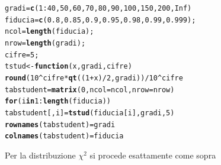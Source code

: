 \documentclass[onecolumn,12pt]{book}\usepackage[]{graphicx}\usepackage[]{color}
\makeatletter
\newcommand{\hlnum}[1]{\textcolor[rgb]{0.686,0.059,0.569}{#1}}%
\newcommand{\hlopt}[1]{\textcolor[rgb]{0,0,0}{#1}}%
\newcommand{\hlstd}[1]{\textcolor[rgb]{0.345,0.345,0.345}{#1}}%
\newcommand{\hlkwa}[1]{\textcolor[rgb]{0.161,0.373,0.58}{\textbf{#1}}}%
\newcommand{\hlkwb}[1]{\textcolor[rgb]{0.69,0.353,0.396}{#1}}%
\newcommand{\hlkwc}[1]{\textcolor[rgb]{0.333,0.667,0.333}{#1}}%
\newcommand{\hlkwd}[1]{\textcolor[rgb]{0.737,0.353,0.396}{\textbf{#1}}}%
\newenvironment{kframe}{%
 \def\at@end@of@kframe{}%
 \ifinner\ifhmode%
  \def\at@end@of@kframe{\end{minipage}}%
  \begin{minipage}{\columnwidth}%
 \fi\fi%
 \def\FrameCommand##1{\hskip\@totalleftmargin \hskip-\fboxsep
 \colorbox{shadecolor}{##1}\hskip-\fboxsep
     \hskip-\linewidth \hskip-\@totalleftmargin \hskip\columnwidth}%
 \MakeFramed {\advance\hsize-\width
   \@totalleftmargin\z@ \linewidth\hsize
   \@setminipage}}%
 {\par\unskip\endMakeFramed%
 \at@end@of@kframe}
\newenvironment{knitrout}{}{} %
\makeatother
\begin{document}
\begin{knitrout}
\color{fgcolor}\begin{kframe}
\begin{alltt}
\hlstd{gradi}\hlkwb{=}\hlkwd{c}\hlstd{(}\hlnum{1}\hlopt{:}\hlnum{40}\hlstd{,}\hlnum{50}\hlstd{,}\hlnum{60}\hlstd{,}\hlnum{70}\hlstd{,}\hlnum{80}\hlstd{,}\hlnum{90}\hlstd{,}\hlnum{100}\hlstd{,}\hlnum{150}\hlstd{,}\hlnum{200}\hlstd{,}\hlnum{Inf}\hlstd{)}
\hlstd{fiducia}\hlkwb{=}\hlkwd{c}\hlstd{(}\hlnum{0.8}\hlstd{,}\hlnum{0.85}\hlstd{,}\hlnum{0.9}\hlstd{,}\hlnum{0.95}\hlstd{,}\hlnum{0.98}\hlstd{,}\hlnum{0.99}\hlstd{,}\hlnum{0.999}\hlstd{);}
\hlstd{ncol}\hlkwb{=}\hlkwd{length}\hlstd{(fiducia);}
\hlstd{nrow}\hlkwb{=}\hlkwd{length}\hlstd{(gradi);}
\hlstd{cifre}\hlkwb{=}\hlnum{5}\hlstd{;}
\hlstd{tstud}\hlkwb{<-}\hlkwa{function}\hlstd{(}\hlkwc{x}\hlstd{,}\hlkwc{gradi}\hlstd{,}\hlkwc{cifre}\hlstd{)}
\hlkwd{round}\hlstd{(}\hlnum{10}\hlopt{^}\hlstd{cifre}\hlopt{*}\hlkwd{qt}\hlstd{((}\hlnum{1}\hlopt{+}\hlstd{x)}\hlopt{/}\hlnum{2}\hlstd{,gradi))}\hlopt{/}\hlnum{10}\hlopt{^}\hlstd{cifre}
\hlstd{tabstudent}\hlkwb{=}\hlkwd{matrix}\hlstd{(}\hlnum{0}\hlstd{,}\hlkwc{ncol}\hlstd{=ncol,}\hlkwc{nrow}\hlstd{=nrow)}
 \hlkwa{for} \hlstd{(i} \hlkwa{in} \hlnum{1}\hlopt{:}\hlkwd{length}\hlstd{(fiducia))}
 \hlstd{tabstudent[,i]}\hlkwb{=} \hlkwd{tstud}\hlstd{(fiducia[i],gradi,}\hlnum{5}\hlstd{)}
 \hlkwd{rownames}\hlstd{(tabstudent)}\hlkwb{=}\hlstd{gradi}
\hlkwd{colnames}\hlstd{(tabstudent)}\hlkwb{=}\hlstd{fiducia}
\end{alltt}
\end{kframe}
\end{knitrout}
 Per la distribuzione $\chi^2$ si procede esattamente come sopra
\end{document}
